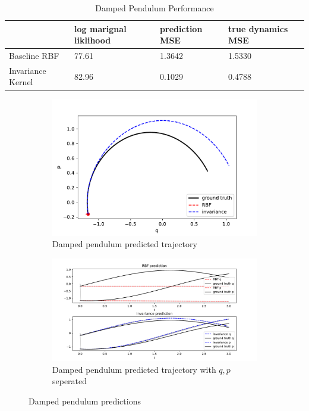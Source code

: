\documentclass{statsmsc}
\begin{document}
\begin{table}[H]
  \centering
  \begin{tabular}{l l l l}
    \hline
                    & log marignal liklihood & prediction MSE & true dynamics MSE\\
    \hline
Baseline RBF & 77.61 & 1.3642 & 1.5330 \\
Invariance Kernel & 82.96 & 0.1029 & 0.4788 \\

    \hline
  \end{tabular}
  \caption{Damped Pendulum Performance}
  \label{tab:damped_pendulum_performance}
\end{table}

\begin{figure}[H]
     \centering
     \begin{subfigure}[b]{\linewidth}
        \centering
        \includegraphics[width=\linewidth]{../codes/figures/damped_pendulum_predicted_trajectory.pdf}
        \caption{Damped pendulum predicted trajectory}
        \label{fig:damped_pendulum_prediction_combined}
     \end{subfigure}
     \hfill
     \begin{subfigure}[b]{\linewidth}
         \centering
         \includegraphics[width=\linewidth]{../codes/figures/damped_pendulum_predicted_trajectory_seperate.pdf}
         \caption{Damped pendulum predicted trajectory with $q, p$ seperated}
         \label{fig:damped_pendulum_prediction_seperate}
     \end{subfigure}
        \caption{Damped pendulum predictions}
        \label{fig:damped_pendulum_prediction}
\end{figure}
\end{document}

